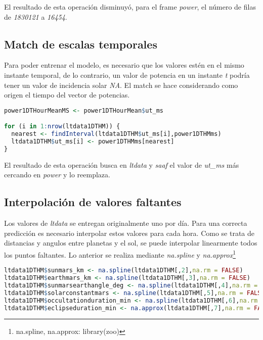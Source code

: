 \documentclass[../Main.tex]{subfiles}
\begin{document}
El resultado de esta operación disminuyó, para el frame \textit{power}, el número de filas de \textit{1830121} a \textit{16454}.

\subsection{Match de escalas temporales}

Para poder entrenar el modelo, es necesario que los valores estén en el mismo instante temporal, de lo contrario, un valor de potencia en un instante \textit{t} podría tener un valor de incidencia solar \textit{NA}. El match se hace considerando como origen el tiempo del vector de potencias.
\newline \par
\begin{lstlisting}[language=R]
power1DTHourMeanMS <- power1DTHourMean$ut_ms

for (i in 1:nrow(ltdata1DTHM)) {
  nearest <- findInterval(ltdata1DTHM$ut_ms[i],power1DTHMms)
  ltdata1DTHM$ut_ms[i] <- power1DTHMms[nearest]
}
\end{lstlisting}

El resultado de esta operación busca en \textit{ltdata} y \textit{saaf} el valor de \textit{ut\_ms} más cercando en \textit{power} y lo reemplaza.

\subsection{Interpolación de valores faltantes}

Los valores de \textit{ltdata} se entregan originalmente uno por día. Para una correcta predicción es necesario interpolar estos valores para cada hora. Como se trata de distancias y angulos entre planetas y el sol, se puede interpolar linearmente todos los puntos faltantes. Lo anterior se realiza mediante \textit{na.spline} y \textit{na.approx}\footnote{na.spline, na.approx: library(zoo)}
\newline \par
\begin{lstlisting}[language=R]
ltdata1DTHM$sunmars_km <- na.spline(ltdata1DTHM[,2],na.rm = FALSE)
ltdata1DTHM$earthmars_km <- na.spline(ltdata1DTHM[,3],na.rm = FALSE)
ltdata1DTHM$sunmarsearthangle_deg <- na.spline(ltdata1DTHM[,4],na.rm = FALSE)
ltdata1DTHM$solarconstantmars <- na.spline(ltdata1DTHM[,5],na.rm = FALSE)
ltdata1DTHM$occultationduration_min <- na.spline(ltdata1DTHM[,6],na.rm = FALSE)
ltdata1DTHM$eclipseduration_min <- na.approx(ltdata1DTHM[,7],na.rm = FALSE, rule=2)
\end{lstlisting}
\end{document}

